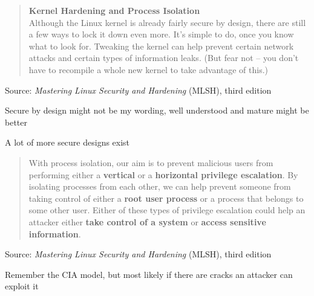 \documentclass[Screen16to9,17pt]{foils}
\begin{document}


\begin{quote}{\bf
Kernel Hardening and Process Isolation}\\
Although the Linux kernel is already fairly secure by design, there are still a few ways to lock it down even more. It’s simple to do, once you know what to look for. Tweaking the kernel can help prevent certain network attacks and certain types of information leaks. (But fear not – you don’t have to recompile a whole new kernel to take advantage of this.)
\end{quote}
Source: \emph{Mastering Linux Security and Hardening} (MLSH), third edition

\begin{list2}
\item Secure by design might not be my wording, well understood and mature might be better
\item A lot of more secure designs exist
\end{list2}



\begin{quote}
With process isolation, our aim is to prevent malicious users from performing either a {\bf vertical} or a {\bf horizontal privilege escalation}. By isolating processes from each other, we can help prevent someone from taking control of either a {\bf root user process} or a process that belongs to some other user. Either of these types of privilege escalation could help an attacker either {\bf take control of a system} or {\bf access sensitive information}.
\end{quote}
Source: \emph{Mastering Linux Security and Hardening} (MLSH), third edition


\begin{list2}
\item Remember the CIA model, but most likely if there are cracks an attacker can exploit it
\end{list2}



\end{document}
